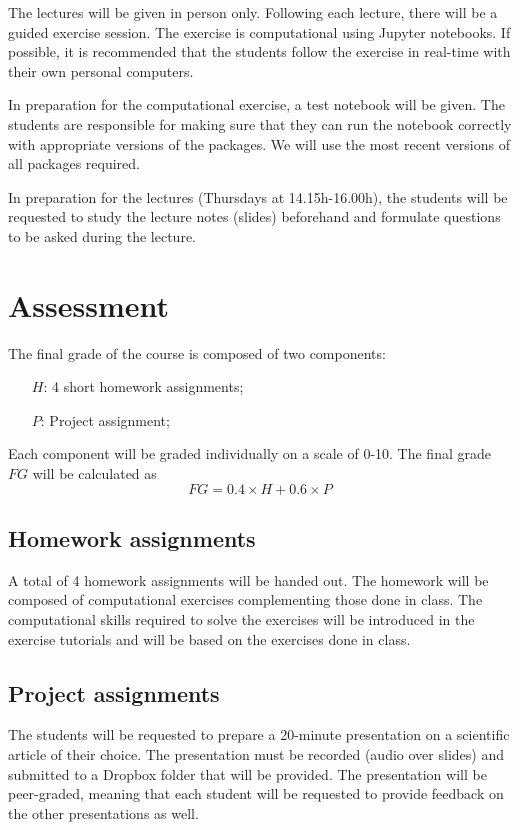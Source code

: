 \documentclass[a4paper]{artikel3}
\begin{document}
The lectures will be given in person only. Following each lecture, there will be a guided exercise session. The exercise is computational using Jupyter notebooks. If possible, it is recommended that the students follow the exercise in real-time with their own personal computers. 

In preparation for the computational exercise, a test notebook will be given. The students are responsible for making sure that they can run the notebook correctly with appropriate versions of the packages. We will use the most recent versions of all packages required.

In preparation for the lectures (Thursdays at 14.15h-16.00h), the students will be requested to study the lecture notes (slides) beforehand and formulate questions to be asked during the lecture.

 
\vspace{-18pt}
\section{Assessment}
The final grade of the course is composed of two components:
\begin{enumerate}
    \item[$H$:] 4 short homework assignments;
    \item[$P$:] Project assignment;
\end{enumerate}
Each component will be graded individually on a scale of 0-10. The final grade $FG$ will be calculated as
$$ FG = 0.4 \times H + 0.6 \times P$$

\vspace{-18pt}
\subsection{Homework assignments} 

A total of 4 homework assignments will be handed out. The homework will be composed of computational exercises complementing those done in class. The computational skills required to solve the exercises will be introduced in the exercise tutorials and will be based on the exercises done in class. 
 
\subsection{Project assignments}

The students will be requested to prepare a 20-minute presentation on a scientific article of their choice. The presentation must be recorded (audio over slides) and submitted to a Dropbox folder that will be provided. The presentation will be peer-graded, meaning that each student will be requested to provide feedback on the other presentations as well.  
 
\end{document}
